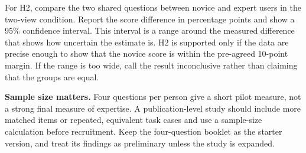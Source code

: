 \documentclass[11pt]{article}
\begin{document}
For H2, compare the two shared questions between novice and expert users in the
two-view condition. Report the score difference in percentage points and show a
95\% confidence interval. This interval is a range around the measured
difference that shows how uncertain the estimate is. H2 is supported only if
the data are precise enough to show that the novice score is within the
pre-agreed 10-point margin. If the range is too wide, call the result
inconclusive rather than claiming that the groups are equal.

\textbf{Sample size matters.} Four questions per person give a short pilot
measure, not a strong final measure of expertise. A publication-level study
should include more matched items or repeated, equivalent task cases and use a
sample-size calculation before recruitment. Keep the four-question booklet as
the starter version, and treat its findings as preliminary unless the study is
expanded.
\end{document}
